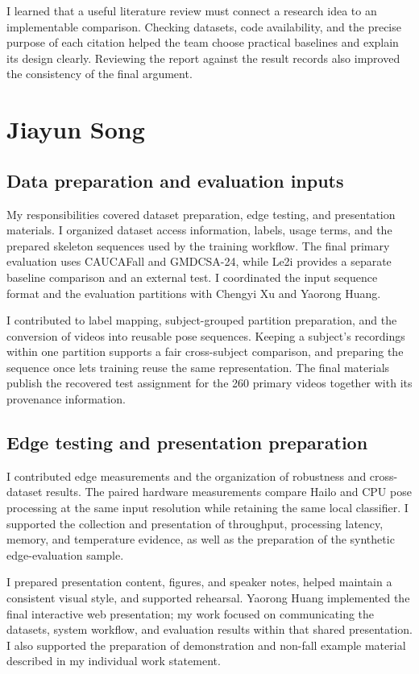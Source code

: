 \documentclass[conference,a4paper]{IEEEtran}
\begin{document}
I learned that a useful literature review must connect a research idea to an implementable comparison. Checking datasets, code availability, and the precise purpose of each citation helped the team choose practical baselines and explain its design clearly. Reviewing the report against the result records also improved the consistency of the final argument.

\balance
\section{Jiayun Song}
\subsection{Data preparation and evaluation inputs}

My responsibilities covered dataset preparation, edge testing, and presentation materials. I organized dataset access information, labels, usage terms, and the prepared skeleton sequences used by the training workflow. The final primary evaluation uses CAUCAFall and GMDCSA-24, while Le2i provides a separate baseline comparison and an external test. I coordinated the input sequence format and the evaluation partitions with Chengyi Xu and Yaorong Huang.

I contributed to label mapping, subject-grouped partition preparation, and the conversion of videos into reusable pose sequences. Keeping a subject's recordings within one partition supports a fair cross-subject comparison, and preparing the sequence once lets training reuse the same representation. The final materials publish the recovered test assignment for the 260 primary videos together with its provenance information.

\subsection{Edge testing and presentation preparation}

I contributed edge measurements and the organization of robustness and cross-dataset results. The paired hardware measurements compare Hailo and CPU pose processing at the same input resolution while retaining the same local classifier. I supported the collection and presentation of throughput, processing latency, memory, and temperature evidence, as well as the preparation of the synthetic edge-evaluation sample.

I prepared presentation content, figures, and speaker notes, helped maintain a consistent visual style, and supported rehearsal. Yaorong Huang implemented the final interactive web presentation; my work focused on communicating the datasets, system workflow, and evaluation results within that shared presentation. I also supported the preparation of demonstration and non-fall example material described in my individual work statement.
\end{document}
